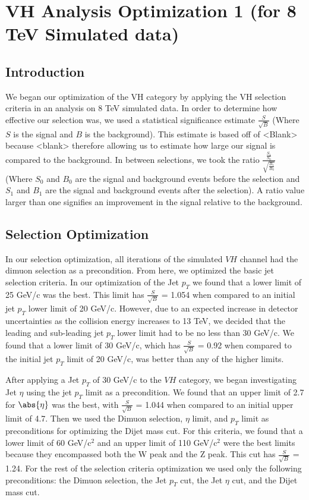 \documentclass[12pt]{article}
\begin{document}
\section{VH Analysis Optimization 1 (for 8 TeV Simulated data)}
\subsection{Introduction}
We began our optimization of the VH category by applying the VH selection criteria in an analysis on 8 TeV simulated data. In order to determine how effective our selection was, we used a statistical significance estimate $\frac{S}{\sqrt{B}}$ (Where $S$ is the signal and $B$ is the background). This estimate is based off of <Blank> because <blank> therefore allowing us to estimate how large our signal is compared to the background. In between selections, we took the ratio $\frac{\frac{S_{1}}{S_{0}}}{\sqrt{\frac{B_{1}}{B_{0}}}}$ (Where $S_{0}$ and $B_{0}$ are the signal and background events before the selection and $S_{1}$ and $B_{1}$ are the signal and background events after the selection). A ratio value larger than one signifies an improvement in the signal relative to the background.
\subsection{Selection Optimization}
In our selection optimization, all iterations of the simulated $VH$ channel had the dimuon selection as a precondition. From here, we optimized the basic jet selection criteria. In our optimization of the Jet $p_{T}$ we found that a lower limit of 25 GeV/c was the best. This limit has $\frac{S}{\sqrt{B}}$ = 1.054 when compared to an initial jet $p_{T}$ lower limit of 20 GeV/c. However, due to an expected increase in detector uncertainties as the collision energy increases to 13 TeV, we decided that the leading and sub-leading jet $p_{T}$ lower limit had to be no less than 30 GeV/c. We found that a lower limit of 30 GeV/c, which has $\frac{S}{\sqrt{B}}$ = 0.92 when compared to the initial jet $p_{T}$ limit of 20 GeV/c, was better than any of the higher limits. 

After applying a Jet $p_{T}$ of 30 GeV/c to the $VH$ category, we began investigating Jet $\eta$ using the jet $p_{T}$ limit as a precondition. We found that an upper limit of 2.7 for $\abs{\eta}$ was the best, with $\frac{S}{\sqrt{B}}$ = 1.044 when compared to an initial upper limit of 4.7. Then we used the Dimuon selection, $\eta$ limit, and $p_{T}$ limit as preconditions for optimizing the Dijet mass cut. For this criteria, we found that a lower limit of 60 GeV/c$^{2}$ and an upper limit of 110 GeV/c$^{2}$ were the best limits because they encompassed both the W peak and the Z peak. This cut has $\frac{S}{\sqrt{B}}$ = 1.24. For the rest of the selection criteria optimization we used only the following preconditions: the Dimuon selection, the Jet $p_{T}$ cut, the Jet $\eta$ cut, and the Dijet mass cut.
\end{document}
